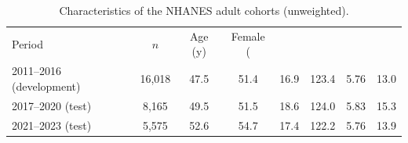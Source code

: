 \begin{table}[!t]
\caption{Characteristics of the NHANES adult cohorts (unweighted).}
\label{tab:cohort}
\centering
\footnotesize
\begin{tabular}{lccccccc}
\hline
Period & $n$ & Age (y) & Female (\\%
2011--2016 (development) & 16,018 & 47.5 & 51.4 & 16.9 & 123.4 & 5.76 & 13.0 \\
2017--2020 (test) & 8,165 & 49.5 & 51.5 & 18.6 & 124.0 & 5.83 & 15.3 \\
2021--2023 (test) & 5,575 & 52.6 & 54.7 & 17.4 & 122.2 & 5.76 & 13.9 \\
\hline
\end{tabular}
\end{table}
